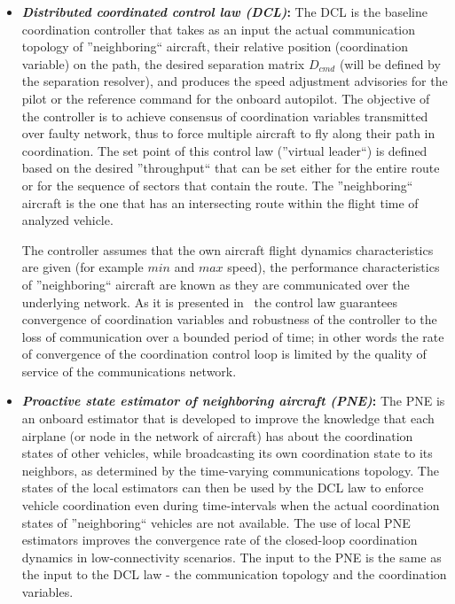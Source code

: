 \documentclass[letter,onecolumn,12pt]{aiaa-tc}
\newcommand{\1}{1_n}
\begin{document}
\begin{itemize}
\setlength{\itemsep}{-1pt}
\vspace{-2mm}

\item \textbf{\emph{Distributed coordinated control law (DCL)}:} The DCL is the baseline coordination controller that takes as an input the actual communication topology of ''neighboring`` aircraft, their relative position (coordination variable) on the path, the desired separation matrix $D_{cmd}$ (will be defined by the separation resolver),  and produces the speed adjustment advisories for the pilot or the reference command for the onboard autopilot. The objective of the controller is to achieve consensus of coordination variables transmitted over faulty network, thus to force multiple aircraft to fly along their path in coordination. The set point of this control law (''virtual leader``) is defined based on the desired ''throughput`` that can be set either for the entire route or for the sequence of sectors that contain the route.  The ''neighboring`` aircraft is the one that has an intersecting route within the flight time of analyzed vehicle.

The controller assumes that the own aircraft flight dynamics characteristics are given (for example $min$ and $max$ speed), the performance characteristics of ''neighboring`` aircraft are known as they are communicated over the underlying network. As it is presented in~\cite{xargay2012csm} the control law guarantees convergence of coordination variables and robustness of the controller to the loss of communication over a bounded period of time; in other words the rate of convergence of the coordination control loop is limited by the quality of service of the communications network.

\item \textbf{\emph{Proactive state estimator of neighboring aircraft (PNE)}:} The PNE is an onboard estimator that is developed to improve the knowledge that each airplane (or node in the network of aircraft) has about the coordination states of other vehicles, while  broadcasting its own coordination state to its neighbors, as determined by the time-varying communications topology. The states of the local estimators can then be used by the DCL law to enforce vehicle coordination even during time-intervals when the actual coordination states of ''neighboring`` vehicles are not available. The use of local PNE estimators improves the convergence rate of the closed-loop coordination dynamics in low-connectivity scenarios. The input to the PNE is the same as the input to the DCL law - the communication topology and the coordination variables.


\end{itemize}
\end{document}
